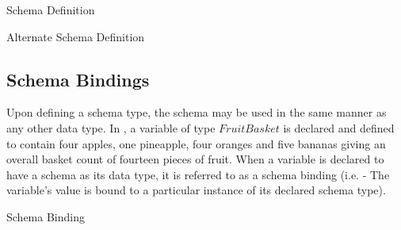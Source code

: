 \documentclass[letterpaper,10pt,draft]{book}
\begin{document}
\begin{example}
\begin{minipage}[t]{0.49\linewidth}
   
\end{minipage}
\begin{minipage}[t]{0.49\linewidth}
   \azsch
   
\end{minipage}

   \caption{Schema Definition}
   \label{ex:Schema}
\end{example}

\begin{example}
\begin{minipage}[t]{0.49\linewidth}
   
\end{minipage}
\begin{minipage}[t]{0.49\linewidth}
   \azed
   
\end{minipage}

   \caption{Alternate Schema Definition}
   \label{ex:SchemaHoriz}
\end{example}

\subsection{Schema Bindings}
   \label{sect:SchBind}

Upon defining a schema type, the schema may be used in the same manner as any other
data type.  In , a variable of type $FruitBasket$ is declared
and defined to contain four apples, one pineapple, four oranges and five bananas
giving an overall basket count of fourteen pieces of fruit.  When a variable is declared
to have a schema as its data type, it is referred to as a schema binding (i.e. -
The variable's value is bound to a particular instance of its declared schema type).

\begin{example}
\begin{minipage}[t]{0.49\linewidth}
   
\end{minipage}
\begin{minipage}[t]{0.49\linewidth}
   \azsch
   
\end{minipage}

   \caption{Schema Binding}
   \label{ex:SchBind}
\end{example}
\end{document}

